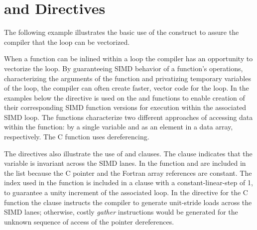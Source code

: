 \section{ and  Directives}
\label{sec:SIMD}

The following example illustrates the basic use of the  construct 
to assure the compiler that the loop can be vectorized.


 

When a function can be inlined within a loop the compiler has an opportunity to 
vectorize the loop. By guaranteeing SIMD behavior of a function's operations, 
characterizing the arguments of the function and privatizing temporary 
variables of the loop, the compiler can often create faster, vector code for 
the loop. In the examples below the  directive is 
used on the  and  functions to enable creation of their 
corresponding SIMD function versions for execution within the associated SIMD 
loop. The functions characterize two different approaches of accessing data 
within the function: by a single variable and as an element in a data array, 
respectively. The  C function uses dereferencing.

The  directives also illustrate the use of 
 and  clauses.  The  clause 
indicates that the variable  is invariant across the SIMD lanes. In 
the  function  and  are included in the  
list because the C pointer and the Fortran array references are constant.  The 
 index used in the  function is included in a  
clause with a constant-linear-step of 1, to guarantee a unity increment of the 
associated loop. In the  directive for the  
C function the   clause instructs the compiler to generate 
unit-stride loads across the SIMD lanes; otherwise,  costly \emph{gather} 
instructions would be generated for the unknown sequence of access of the 
pointer dereferences.


